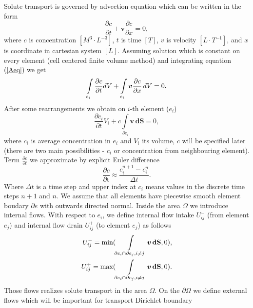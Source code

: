 Solute transport is governed by advection equation which can be written in the form
\begin{equation}
 \frac{\partial c}{\partial t} + \boldsymbol{v} \frac{\partial c}{\partial x}  = 0, \label{Aeq}
\end{equation}
where $c$ is concentration $[M^3 \cdot L^{-3}]$, $t$ is time $[T]$, $v$ is velocity $[L \cdot T^{-1}]$, and $x$ is coordinate in cartesian system $[L]$.
Assuming solution which is constant on every element (cell centered finite volume method) and integrating equation (\ref{Aeq}) we get
    \begin{equation}
    \int\limits_{e_i} \frac{\partial c}{\partial t} dV + \int\limits_{e_i} \boldsymbol{v} \frac{\partial c}{\partial x} \, dV = 0. \notag 
    \end{equation}
    After some rearrangements we obtain on $i$-th element ($e_i$)
    \begin{equation}
    \frac{\partial c_i}{\partial t}  V_{i} + c \int\limits_{\partial e_i }  \boldsymbol{v} \, \mathbf{dS} = 0, \label{Aeqint} 
    \end{equation}
  where $c_i$ is average concentration in $e_i$ and $V_{i}$ its volume, $c$ will be specified later (there are two main possibilities - $c_i$ or concentration from neighbouring element).
    Term $\frac{\partial c}{\partial t}$ we approximate by explicit Euler difference
    \begin{equation}
     \frac{\partial c}{\partial \textrm{t}} \approx \frac{c_{i}^{n+1} - c_{i}^n}{\Delta t}. \label{expliciteuler}
    \end{equation}
    Where $\Delta t$ is a time step and upper index at $c_i$ means values in the discrete time steps $n+1$ and $n$.
    We assume that all elements have piecewise smooth element boudary $\partial e$ with outwards directed normal. Inside the area $\Omega$ we introduce internal flows.
    With respect to $e_i$, we define internal flow intake $U_{ij}^{-}$ (from element $e_j$) and
    internal flow drain $U_{ij}^{+}$ (to element $e_j$) as follows
    \begin{eqnarray}     
      U_{ij}^{-} = \text{min}(\int\limits_{\partial e_i \cap \partial e_j, i \ne j} \boldsymbol{v} \, \mathbf{dS},0), \notag \\
      U_{ij}^{+} = \text{max}(\int\limits_{\partial e_i \cap \partial e_j, i \ne j} \boldsymbol{v} \, \mathbf{dS},0). \label{iflux}  
    \end{eqnarray}
  Those flows realizes solute transport in the area $\Omega$. On the $\partial\Omega$ we define external flows which will be important for transport Dirichlet boundary  

